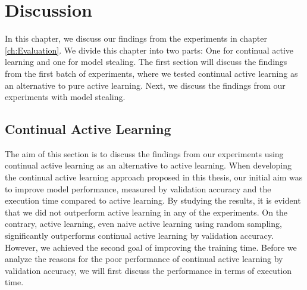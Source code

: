 
\chapter{Discussion}
\label{ch:Discussion}
In this chapter, we discuss our findings from the experiments in chapter \ref{ch:Evaluation}. We divide this chapter into two parts: 
One for continual active learning and one for model stealing. The first section will discuss the findings from the first
batch of experiments, where we tested continual active learning as an alternative to pure active learning. Next, we discuss the findings
from our experiments with model stealing.

\section{Continual Active Learning}
\label{sec:Discussion:ContinualActiveLearning}
The aim of this section is to discuss the findings from our experiments using continual active learning as an alternative to active learning.
When developing the continual active learning approach proposed in this thesis, our initial aim was to improve model performance,
measured by validation accuracy and the execution time compared to active learning. By studying the results, it is evident that
we did not outperform active learning in any of the experiments. On the contrary, active learning, even naive active learning using random sampling,
significantly outperforms continual active learning by validation accuracy. However, we achieved the second goal of improving the training
time. Before we analyze the reasons for the poor performance of continual active learning by validation accuracy, we will first discuss
the performance in terms of execution time.

